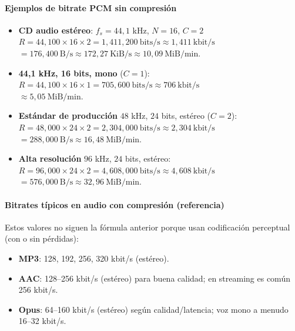 \documentclass[11pt,a4paper]{article}
\begin{document}
\paragraph{Ejemplos de bitrate PCM sin compresión}
\begin{itemize}
  \item \textbf{CD audio estéreo}: $f_s=44{,}1$ kHz, $N=16$, $C=2$ \\
    $R = 44{,}100 \times 16 \times 2 = 1{,}411{,}200\ \text{bits/s} \approx 1{,}411\ \text{kbit/s}$ \\
    $= 176{,}400\ \text{B/s} \approx 172{,}27\ \text{KiB/s} \approx 10{,}09\ \text{MiB/min}$.
  \item \textbf{44{,}1 kHz, 16 bits, mono} ($C=1$):\\
    $R = 44{,}100 \times 16 \times 1 = 705{,}600\ \text{bits/s} \approx 706\ \text{kbit/s}$ \\
    $\approx 5{,}05\ \text{MiB/min}$.
  \item \textbf{Estándar de producción} $48$ kHz, $24$ bits, estéreo ($C=2$):\\
    $R = 48{,}000 \times 24 \times 2 = 2{,}304{,}000\ \text{bits/s} \approx 2{,}304\ \text{kbit/s}$ \\
    $= 288{,}000\ \text{B/s} \approx 16{,}48\ \text{MiB/min}$.
  \item \textbf{Alta resolución} $96$ kHz, $24$ bits, estéreo: \\
    $R = 96{,}000 \times 24 \times 2 = 4{,}608{,}000\ \text{bits/s} \approx 4{,}608\ \text{kbit/s}$ \\
    $= 576{,}000\ \text{B/s} \approx 32{,}96\ \text{MiB/min}$.
\end{itemize}

\paragraph{Bitrates típicos en audio con compresión (referencia)}
Estos valores no siguen la fórmula anterior porque usan codificación perceptual (con o sin pérdidas):
\begin{itemize}
  \item \textbf{MP3}: 128, 192, 256, 320 kbit/s (estéreo).
  \item \textbf{AAC}: 128--256 kbit/s (estéreo) para buena calidad; en streaming es común 256 kbit/s.
  \item \textbf{Opus}: 64--160 kbit/s (estéreo) según calidad/latencia; voz mono a menudo 16--32 kbit/s.
\end{itemize}
\end{document}
